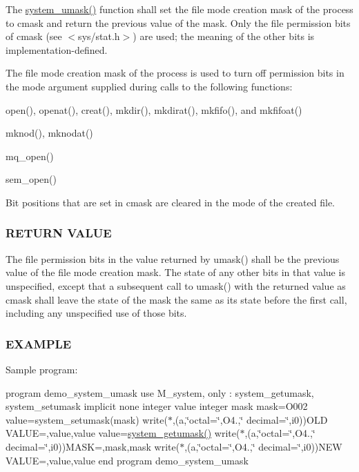 The \mbox{\hyperlink{interfacem__system_1_1system__umask_a10fa518062761065afc422f100ed0a76}{system\+\_\+umask()}} function shall set the file mode creation mask of the process to cmask and return the previous value of the mask. Only the file permission bits of cmask (see $<$sys/stat.\+h$>$) are used; the meaning of the other bits is implementation-\/defined.

The file mode creation mask of the process is used to turn off permission bits in the mode argument supplied during calls to the following functions\+:


\begin{DoxyItemize}
\item open(), openat(), creat(), mkdir(), mkdirat(), mkfifo(), and mkfifoat()
\item mknod(), mknodat()
\item mq\+\_\+open()
\item sem\+\_\+open()
\end{DoxyItemize}

Bit positions that are set in cmask are cleared in the mode of the created file.

\subsubsection*{R\+E\+T\+U\+RN V\+A\+L\+UE}

The file permission bits in the value returned by umask() shall be the previous value of the file mode creation mask. The state of any other bits in that value is unspecified, except that a subsequent call to umask() with the returned value as cmask shall leave the state of the mask the same as its state before the first call, including any unspecified use of those bits.

\subsubsection*{E\+X\+A\+M\+P\+LE}

Sample program\+:

program demo\+\_\+system\+\_\+umask use M\+\_\+system, only \+: system\+\_\+getumask, system\+\_\+setumask implicit none integer value integer mask mask=O\textquotesingle{}002\textquotesingle{} value=system\+\_\+setumask(mask) write($\ast$,\textquotesingle{}(a,\char`\"{}octal=\char`\"{},O4.,\char`\"{} decimal=\char`\"{},i0)\textquotesingle{})\textquotesingle{}O\+LD V\+A\+L\+UE=\textquotesingle{},value,value value=\mbox{\hyperlink{namespacem__system_aa9ca951be39d2ea738d627cf42c00ddd}{system\+\_\+getumask()}} write($\ast$,\textquotesingle{}(a,\char`\"{}octal=\char`\"{},O4.,\char`\"{} decimal=\char`\"{},i0)\textquotesingle{})\textquotesingle{}M\+A\+SK=\textquotesingle{},mask,mask write($\ast$,\textquotesingle{}(a,\char`\"{}octal=\char`\"{},O4.,\char`\"{} decimal=\char`\"{},i0)\textquotesingle{})\textquotesingle{}N\+EW V\+A\+L\+UE=\textquotesingle{},value,value end program demo\+\_\+system\+\_\+umask

